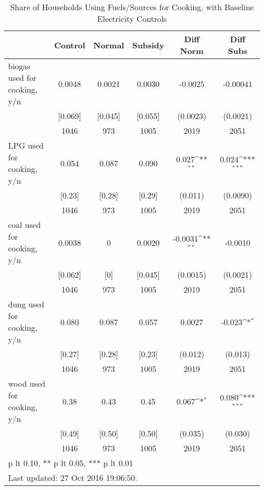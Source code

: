 \begin{table}[htbp]\centering
\def\sym#1{\ifmmode^{#1}\else\(^{#1}\)\fi}
\caption{Share of Households Using Fuels/Sources for Cooking, with Baseline Electricity Controls \label{tab:"balance"}}
\begin{tabular*}{0.9\hsize}{@{\hskip\tabcolsep\extracolsep\fill}l*{1}{ccccc}}
\toprule
                                &  Control&   Normal&  Subsidy&Diff Norm         &Diff Subs         \\
\midrule
biogas used for cooking, y/n    &   0.0048&   0.0021&   0.0030&  -0.0025         & -0.00041         \\
                                &  [0.069]&  [0.045]&  [0.055]& (0.0023)         & (0.0021)         \\
                                &     1046&      973&     1005&     2019         &     2051         \\
LPG used for cooking, y/n       &    0.054&    0.087&    0.090&    0.027\sym{**} &    0.024\sym{***}\\
                                &   [0.23]&   [0.28]&   [0.29]&  (0.011)         & (0.0090)         \\
                                &     1046&      973&     1005&     2019         &     2051         \\
coal used for cooking, y/n      &   0.0038&        0&   0.0020&  -0.0031\sym{**} &  -0.0010         \\
                                &  [0.062]&      [0]&  [0.045]& (0.0015)         & (0.0021)         \\
                                &     1046&      973&     1005&     2019         &     2051         \\
dung used for cooking, y/n      &    0.080&    0.087&    0.057&   0.0027         &   -0.023\sym{*}  \\
                                &   [0.27]&   [0.28]&   [0.23]&  (0.012)         &  (0.013)         \\
                                &     1046&      973&     1005&     2019         &     2051         \\
wood used for cooking, y/n      &     0.38&     0.43&     0.45&    0.067\sym{*}  &    0.080\sym{***}\\
                                &   [0.49]&   [0.50]&   [0.50]&  (0.035)         &  (0.030)         \\
                                &     1046&      973&     1005&     2019         &     2051         \\
\bottomrule
\multicolumn{6}{l}{\footnotesize * p lt 0.10, ** p lt 0.05, *** p lt 0.01}\\
\multicolumn{6}{l}{\footnotesize Last updated: 27 Oct 2016 19:06:50.}\\
\end{tabular*}
\end{table}
